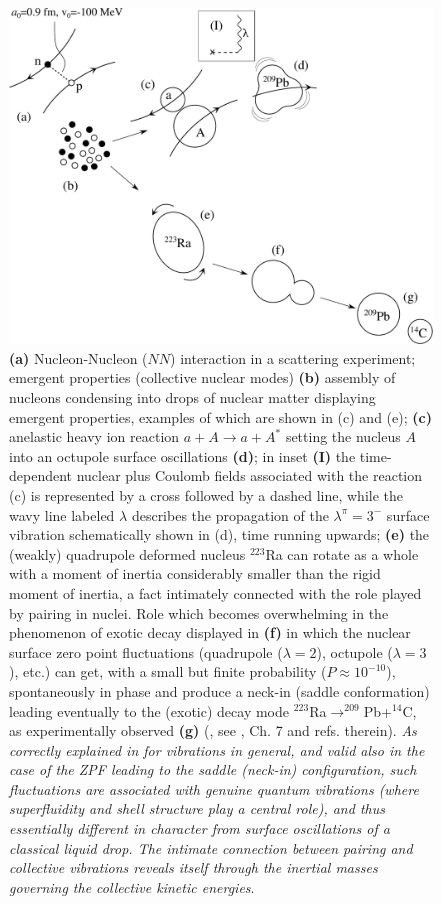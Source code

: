 \begin{figure}
	\centerline {
		\includegraphics*[width=15cm]{introduccion/figs/figpreface2-v2}
	}
	\caption{\textbf{(a)} Nucleon-Nucleon ($NN$) interaction in a scattering experiment; emergent properties (collective nuclear modes) \textbf{(b)} assembly of nucleons condensing into drops of nuclear matter displaying emergent properties, examples of which are shown in (c) and (e); \textbf{(c)} anelastic heavy ion reaction $a+A\to a+A^*$ setting the nucleus $A$ into an octupole surface oscillations \textbf{(d)}; in inset \textbf{(I)} the time-dependent nuclear plus Coulomb fields associated with the reaction (c) is represented by a cross followed by a dashed line, while the wavy line labeled $\lambda$ describes the propagation of the $\lambda^\pi=3^-$ surface vibration schematically shown in (d), time running upwards; \textbf{(e)} the (weakly) quadrupole deformed nucleus $^{223}$Ra  can rotate as a whole with a moment of inertia considerably smaller than the rigid moment of inertia, a fact intimately connected with the role played by pairing in nuclei. Role which becomes overwhelming in the phenomenon of exotic decay displayed in \textbf{(f)} in which the nuclear  surface zero point fluctuations  (quadrupole ($\lambda=2$), octupole ($\lambda=3$), etc.) can get, with a small but finite probability ($P\approx10^{-10}$), spontaneously in phase and produce a neck-in (saddle conformation) leading eventually to the (exotic) decay mode  $^{223}$Ra$\to^{209}$Pb+$^{14}$C, as experimentally observed \textbf{(g)} (\cite{Rose:84}, see \cite{Brink:05}, Ch. 7 and refs. therein). \textit{As correctly explained in \cite{Matsuyanagi:13} for vibrations in general, and  valid also in the case of the ZPF leading to the saddle (neck-in) configuration,  such fluctuations are associated with genuine quantum vibrations (where superfluidity and shell structure play a central role), and thus essentially different in character from surface oscillations of a classical liquid drop. The intimate connection between pairing and collective vibrations reveals itself through the inertial masses governing the collective kinetic energies}.}
	\label{fig1.0.2}
\end{figure}
